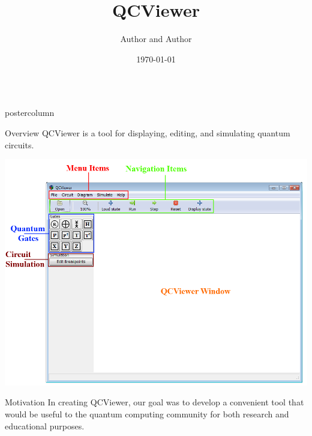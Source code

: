 \documentclass[final]{beamer} %
\title[QCViewer]{QCViewer}
\author[Author]{Author and Author}
\institute[IQC, University of Waterloo]{Quantum Circuits group, IQC, University of Waterloo}
\date{\today}
\begin{document}
  \begin{frame}{} 
  \begin{columns}
    \begin{column}{.33\textwidth}
      \begin{beamercolorbox}[center,wd=\textwidth]{postercolumn}
         \begin{minipage}[T]{.95\textwidth}
           \begin{block}{\large Overview}
             QCViewer is a tool for displaying, editing, and simulating quantum circuits.

             \centering 
             \includegraphics{figures/QCViewerGUI.png}
           \end{block}
           \begin{block}{\large Motivation}
             In creating QCViewer, our goal was to develop a convenient tool that would be useful to 
             the quantum computing community for both research and educational purposes. 


\end{block}
\end{minipage}
\end{beamercolorbox}
\end{column}
\end{columns}
\end{frame}
\end{document}
